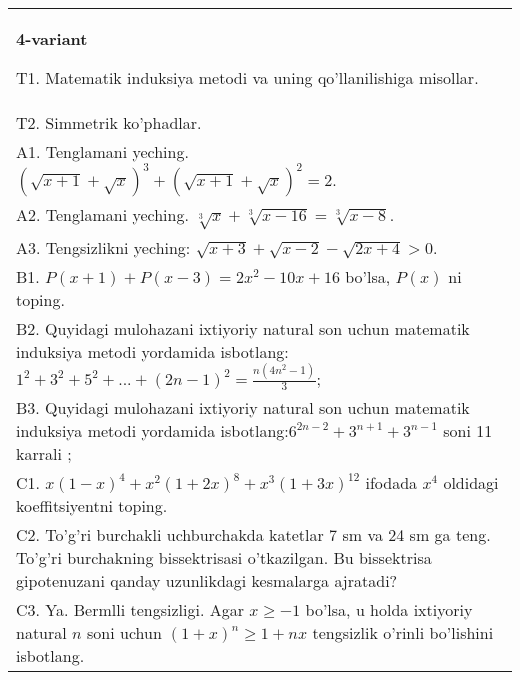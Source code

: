 \documentclass{article}
\begin{document}
\begin{tabular}{m{17cm}}
\textbf{4-variant}
\newline

T1. Matematik induksiya metodi va uning qo'llanilishiga misollar. \\
T2. Simmetrik ko'phadlar. \\
A1. Tenglamani yeching. \((\sqrt{x + 1} + \sqrt{x})^{3} + (\sqrt{x + 1} + \sqrt{x})^{2} = 2\). \\
A2. Tenglamani yeching. \(\sqrt[3]{x} + \sqrt[3]{x - 16} = \sqrt[3]{x - 8}\). \\
A3. Tengsizlikni yeching: \(\sqrt{x + 3} + \sqrt{x - 2} - \sqrt{2x + 4} > 0\). \\
B1. \(P(x + 1) + P(x - 3) = 2x^{2} - 10x + 16\) bo'lsa, \(P(x)\) ni toping. \\
B2. Quyidagi mulohazani ixtiyoriy natural son uchun matematik induksiya metodi yordamida isbotlang: \(1^{2} + 3^{2} + 5^{2} + ... + (2n - 1)^{2} = \frac{n\left( 4n^{2} - 1 \right)}{3}\); \\
B3. Quyidagi mulohazani ixtiyoriy natural son uchun matematik induksiya metodi yordamida isbotlang:\(6^{2n - 2} + 3^{n + 1} + 3^{n - 1}\) soni 11 karrali ; \\
C1. \(x(1 - x)^{4} + x^{2}(1 + 2x)^{8} + x^{3}(1 + 3x)^{12}\) ifodada \(x^{4}\) oldidagi koeffitsiyentni toping. \\
C2. To'g'ri burchakli uchburchakda katetlar 7 sm va 24 sm ga teng. To'g'ri burchakning bissektrisasi o'tkazilgan. Bu bissektrisa gipotenuzani qanday uzunlikdagi kesmalarga ajratadi? \\
C3. Ya. Bermlli tengsizligi. Agar \(x \geq - 1\) bo'lsa, u holda ixtiyoriy natural \(n\) soni uchun \((1 + x)^{n} \geq 1 + nx\) tengsizlik o'rinli bo'lishini isbotlang. \\

\end{tabular}
\vspace{1cm}
\end{document}
